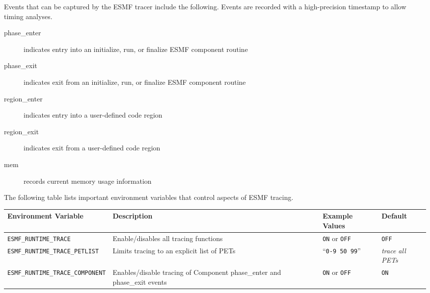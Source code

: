 Events that can be captured by the ESMF tracer include the following. Events
are recorded with a high-precision timestamp to allow timing analyses.
\begin{description}
\item [phase\_enter] indicates entry into an initialize, run, or finalize ESMF component routine
\item [phase\_exit] indicates exit from an initialize, run, or finalize ESMF component routine
\item [region\_enter] indicates entry into a user-defined code region
\item [region\_exit] indicates exit from a user-defined code region
\item [mem] records current memory usage information
\end{description}

The following table lists important environment variables that control
aspects of ESMF tracing.

\begin{tabular} {|p{6cm}|p{8cm}|p{6cm}|p{6cm}|}
     \hline\hline
     {\bf Environment Variable} & {\bf Description} & {\bf Example Values} & {\bf Default}\\
     \hline\hline
     {\tt ESMF\_RUNTIME\_TRACE} & Enable/disables all tracing functions & {\tt ON} or {\tt OFF} & {\tt OFF} \\
     \hline\hline
     {\tt ESMF\_RUNTIME\_TRACE\_PETLIST} & Limits tracing to an explicit list of PETs & ``{\tt 0-9 50 99}'' & {\em trace all PETs}\\
     \hline\hline
     {\tt ESMF\_RUNTIME\_TRACE\_COMPONENT} & Enables/disable tracing of Component phase\_enter and phase\_exit events & {\tt ON} or {\tt OFF} & {\tt ON} \\
     \hline\hline
\end{tabular}



